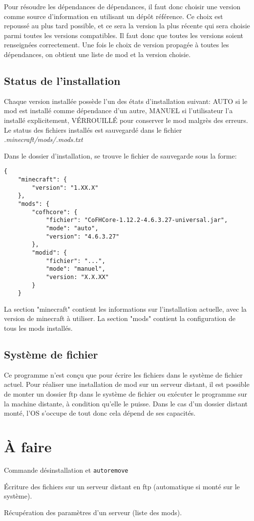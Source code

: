 \documentclass{article}
\begin{document}
Pour résoudre les dépendances de dépendances, il faut donc choisir une version comme source d'information en utilisant un dépôt référence.
Ce choix est repoussé au plus tard possible, et ce sera la version la plus récente qui sera choisie parmi toutes les versions compatibles.
Il faut donc que toutes les versions soient renseignées correctement.
Une fois le choix de version propagée à toutes les dépendances, on obtient une liste de mod et la version choisie.

\subsection{Status de l'installation}
Chaque version installée possède l'un des états d'installation suivant: AUTO si le mod est installé comme dépendance d'un autre, MANUEL si l'utilisateur l'a installé explicitement, VÉRROUILLÉ pour conserver le mod malgrès des erreurs.
Le status des fichiers installés est sauvegardé dans le fichier \textit{.minecraft/mods/.mods.txt}

Dans le dossier d'installation, se trouve le fichier de sauvegarde sous la forme:
\begin{verbatim}
{
    "minecraft": {
        "version": "1.XX.X"
    },
    "mods": {
        "cofhcore": {
            "fichier": "CoFHCore-1.12.2-4.6.3.27-universal.jar",
            "mode": "auto",
            "version": "4.6.3.27"
        },
        "modid": {
            "fichier": "...",
            "mode": "manuel",
            "version: "X.X.XX"
        }
    }
\end{verbatim}

La section "minecraft" contient les informations sur l'installation actuelle, avec la version de minecraft à utiliser.
La section "mods" contient la configuration de tous les mods installés.

\subsection{Système de fichier}
Ce programme n'est conçu que pour écrire les fichiers dans le système de fichier actuel.
Pour réaliser une installation de mod sur un serveur distant, il est possible de monter un dossier ftp dans le système de fichier ou exécuter le programme sur la machine distante, à condition qu'elle le puisse.
Dans le cas d'un dossier distant monté, l'OS s'occupe de tout donc cela dépend de ses capacités.

\newpage
\section{À faire}
Commande désinstallation et \texttt{autoremove}

Écriture des fichiers sur un serveur distant en ftp (automatique si monté sur le système).

Récupération des paramètres d'un serveur (liste des mods).
	
\end{document}
